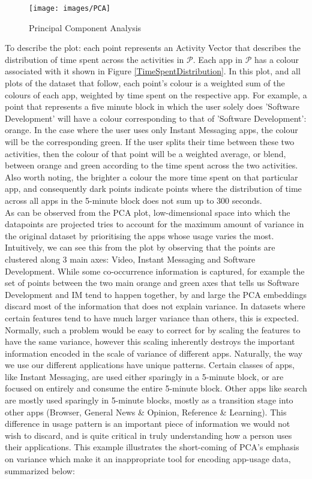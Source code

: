 \begin{figure}[htbp]
    \centering
    \texttt{[image: images/PCA]}
    \caption{Principal Component Analysis}
    \label{fig:pca}
\end{figure}

To describe the plot: each point represents an Activity Vector that describes the distribution of time spent across the activities in $\mathcal{P}$. Each app in $\mathcal{P}$ has a colour associated with it shown in Figure \ref{TimeSpentDistribution}. In this plot, and all plots of the dataset that follow, each point's colour is a weighted sum of the colours of each app, weighted by time spent on the respective app. For example, a point that represents a five minute block in which the user solely does 'Software Development' will have a colour corresponding to that of 'Software Development': orange. In the case where the user uses only Instant Messaging apps, the colour will be the corresponding green. If the user splits their time between these two activities, then the colour of that point will be a weighted average, or blend, between orange and green according to the time spent across the two activities. Also worth noting, the brighter a colour the more time spent on that particular app, and consequently dark points indicate points where the distribution of time across all apps in the 5-minute block does not sum up to 300 seconds. \\

As can be observed from the PCA plot, low-dimensional space into which the datapoints are projected tries to account for the maximum amount of variance in the original dataset by prioritising the apps whose usage varies the most. Intuitively, we can see this from the plot by observing that the points are clustered along 3 main axes: Video, Instant Messaging and Software Development. While some co-occurrence information is captured, for example the set of points between the two main orange and green axes that tells us Software Development and IM tend to happen together, by and large the PCA embeddings discard most of the information that does not explain variance. In datasets where certain features tend to have much larger variance than others, this is expected. Normally, such a problem would be easy to correct for by scaling the features to have the same variance, however this scaling inherently destroys the important information encoded in the scale of variance of different apps. Naturally, the way we use our different applications have unique patterns. Certain classes of apps, like Instant Messaging, are used either sparingly in a 5-minute block, or are focused on entirely and consume the entire 5-minute block. Other apps like search are mostly used sparingly in 5-minute blocks, mostly as a transition stage into other apps (Browser, General News \& Opinion, Reference \& Learning). This difference in usage pattern is an important piece of information we would not wish to discard, and is quite critical in truly understanding how a person uses their applications. This example illustrates the short-coming of PCA's emphasis on variance which make it an inappropriate tool for encoding app-usage data, summarized below:

